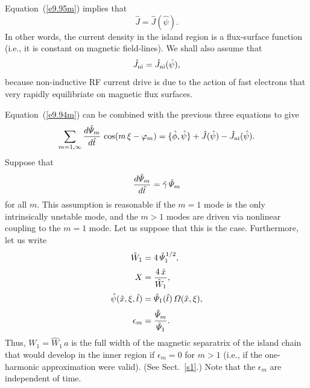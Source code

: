 \documentclass[12pt,prb,aps]{revtex4-1}
\begin{document}
Equation~(\ref{e9.95m}) implies that
\begin{equation}\label{e9.98m}
\hat{J} = \hat{J}(\hat{\psi}).
\end{equation}
In other words, the current density in the island region is a flux-surface function (i.e., it is constant
on magnetic field-lines). We shall also assume that
\begin{equation}
\hat{J}_{\rm ni} = \hat{J}_{\rm ni}(\hat{\psi}), 
\end{equation}
because non-inductive RF current drive is due to the action of fast electrons that very rapidly equilibriate on
magnetic flux surfaces. 

Equation~(\ref{e9.94m}) can be combined with the previous three equations to give 
\begin{equation}\label{e41}
\sum_{m=1,\infty}\frac{d\hat{\mit\Psi}_m}{d\hat{t}}\,\cos(m\,\xi-\varphi_m)=\{\skew{3}\hat{\phi},\hat{\psi}\}+\hat{J}(\hat{\psi})-\hat{J}_{\rm ni}(\hat{\psi}). 
\end{equation}
Suppose that
\begin{equation}\label{e42}
\frac{d\hat{\mit\Psi}_m}{d\hat{t}} =\tilde{\gamma}\,\hat{\mit\Psi}_m
\end{equation}
for all $m$. This assumption is reasonable if the $m=1$ mode is the only intrinsically unstable mode, and the $m>1$ modes are driven via nonlinear coupling  to the $m=1$ mode. Let us suppose that this is the case. Furthermore, let us write
\begin{align}
\hat{W}_1 &= 4\,\hat{\mit\Psi}_1^{1/2},\label{e43}\\[0.5ex]
X &= \frac{4\,\hat{x}}{\hat{W}_1},\label{e44}\\[0.5ex]
\hat{\psi}(\hat{x},\xi,\hat{t}) &= \hat{\mit\Psi}_1(\hat{t})\,{\mit\Omega}(\hat{x},\xi),\\[0.5ex]
\epsilon_m &= \frac{\hat{\mit\Psi}_m}{\hat{\mit\Psi}_1}.\label{e46}
\end{align}
Thus, $W_1=\hat{W}_1\,a$ is the full width of the magnetic separatrix of the island chain that would develop in the inner region if $\epsilon_m=0$ for $m>1$ (i.e., if the one-harmonic approximation were valid). (See Sect.~\ref{s1}.) Note that the $\epsilon_m$ are independent of time. 
\end{document}
